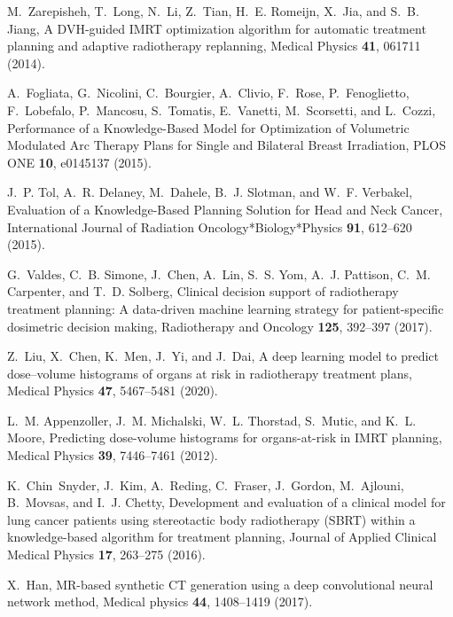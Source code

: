 \documentclass[10pt]{article}
\begin{document}
\begin{thebibliography}{10}
M.~Zarepisheh, T.~Long, N.~Li, Z.~Tian, H.~E. Romeijn, X.~Jia, and S.~B. Jiang,
\newblock A DVH-guided IMRT optimization algorithm for automatic treatment
  planning and adaptive radiotherapy replanning,
\newblock Medical Physics {\bf 41}, 061711 (2014).

A.~Fogliata, G.~Nicolini, C.~Bourgier, A.~Clivio, F.~Rose, P.~Fenoglietto,
  F.~Lobefalo, P.~Mancosu, S.~Tomatis, E.~Vanetti, M.~Scorsetti, and L.~Cozzi,
\newblock Performance of a Knowledge-Based Model for Optimization of Volumetric
  Modulated Arc Therapy Plans for Single and Bilateral Breast Irradiation,
\newblock PLOS ONE {\bf 10}, e0145137 (2015).

J.~P. Tol, A.~R. Delaney, M.~Dahele, B.~J. Slotman, and W.~F. Verbakel,
\newblock Evaluation of a Knowledge-Based Planning Solution for Head and Neck
  Cancer,
\newblock International Journal of Radiation Oncology*Biology*Physics {\bf 91},
  612--620 (2015).

G.~Valdes, C.~B. Simone, J.~Chen, A.~Lin, S.~S. Yom, A.~J. Pattison, C.~M.
  Carpenter, and T.~D. Solberg,
\newblock Clinical decision support of radiotherapy treatment planning: A
  data-driven machine learning strategy for patient-specific dosimetric
  decision making,
\newblock Radiotherapy and Oncology {\bf 125}, 392--397 (2017).

Z.~Liu, X.~Chen, K.~Men, J.~Yi, and J.~Dai,
\newblock A deep learning model to predict dose–volume histograms of organs
  at risk in radiotherapy treatment plans,
\newblock Medical Physics {\bf 47}, 5467--5481 (2020).

L.~M. Appenzoller, J.~M. Michalski, W.~L. Thorstad, S.~Mutic, and K.~L. Moore,
\newblock Predicting dose-volume histograms for organs-at-risk in IMRT
  planning,
\newblock Medical Physics {\bf 39}, 7446--7461 (2012).

K.~Chin~Snyder, J.~Kim, A.~Reding, C.~Fraser, J.~Gordon, M.~Ajlouni, B.~Movsas,
  and I.~J. Chetty,
\newblock Development and evaluation of a clinical model for lung cancer
  patients using stereotactic body radiotherapy (SBRT) within a knowledge-based
  algorithm for treatment planning,
\newblock Journal of Applied Clinical Medical Physics {\bf 17}, 263--275
  (2016).

X.~Han,
\newblock MR-based synthetic CT generation using a deep convolutional neural
  network method,
\newblock Medical physics {\bf 44}, 1408--1419 (2017).


\end{thebibliography}
\end{document}
